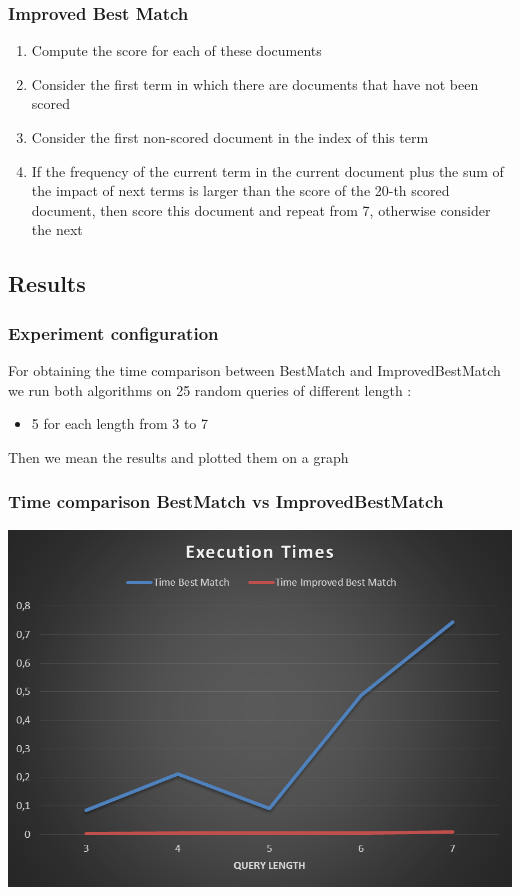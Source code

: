 \documentclass{beamer}
\begin{document}
\begin{frame}
\frametitle{Improved Best Match}
\begin{enumerate}	
	\suite
	\item Compute the score for each of these documents
	\item Consider the first term in which there are documents that have not been scored
	\item Consider the first non-scored document in the index of this term
	\item If the frequency of the current term in the current document plus the sum of the impact of next terms is larger than the score of the 20-th scored document, then score this document and repeat from 7, otherwise consider the next    
\end{enumerate}
\end{frame}

\subsection{Results}
\begin{frame}
\frametitle{Experiment configuration}
For obtaining the time comparison between BestMatch and ImprovedBestMatch we run both algorithms on 25 random queries of different length :\\
\begin{itemize}
\item 5 for each length from 3 to 7
\end{itemize} 
Then we mean the results and plotted them on a graph
\end{frame}

\begin{frame}
	\frametitle{Time comparison BestMatch vs ImprovedBestMatch}
	\begin{center}
	\includegraphics[scale=0.32]{img/Matching/Tempi.PNG} 
	\end{center}
\end{frame}
\end{document}
